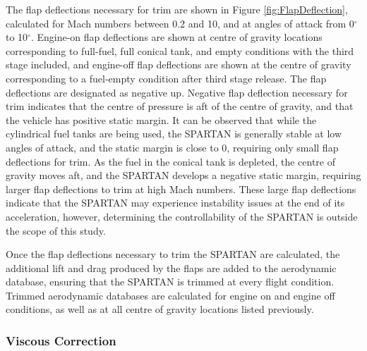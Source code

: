 		The flap deflections necessary for trim are shown in Figure \ref{fig:FlapDeflection}, calculated for Mach numbers between 0.2 and 10, and at angles of attack from 0$^\circ$ to 10$^\circ$. Engine-on flap deflections are shown at centre of gravity locations corresponding to full-fuel, full conical tank, and empty conditions with the third stage included, and engine-off flap deflections are shown at the centre of gravity corresponding to a fuel-empty condition after third stage release. 
		The flap deflections are designated as negative up. Negative flap deflection necessary for trim indicates that the centre of pressure is aft of the centre of gravity, and that the vehicle has positive static margin.
		It can be observed that while the cylindrical fuel tanks are being used, the SPARTAN is generally stable at low angles of attack, and the static margin is close to 0, requiring only small flap deflections for trim. As the fuel in the conical tank is depleted, the centre of gravity moves aft, and the SPARTAN develops a negative static margin, requiring larger flap deflections to trim at high Mach numbers. These large flap deflections indicate that the SPARTAN may experience instability issues at the end of its acceleration, however, determining the controllability of the SPARTAN is outside the scope of this study. 
		
		  Once the flap deflections necessary to trim the SPARTAN are calculated, the additional lift and drag produced by the flaps are added to the aerodynamic database, ensuring that the SPARTAN is trimmed at every flight condition.
		  Trimmed aerodynamic databases are calculated for engine on and engine off conditions, as well as at all centre of gravity locations listed previously. 
		
		
		
		\subsubsection{Viscous Correction}
		
